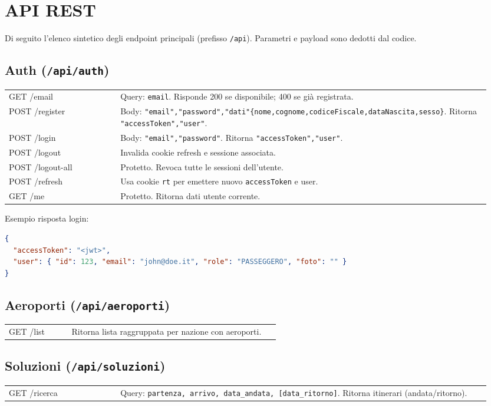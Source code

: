 \documentclass[11pt,a4paper]{article}
\begin{document}
\section{API REST}
Di seguito l'elenco sintetico degli endpoint principali (prefisso \texttt{/api}). Parametri e payload sono dedotti dal codice.

\subsection{Auth (\texttt{/api/auth})}
\begin{longtable}{p{0.22\linewidth}p{0.73\linewidth}}
GET /email & Query: \texttt{email}. Risponde 200 se disponibile; 400 se già registrata. \\
POST /register & Body: \texttt{"email","password","dati"\{nome,cognome,codiceFiscale,dataNascita,sesso\}}. Ritorna \texttt{"accessToken","user"}. \\
POST /login & Body: \texttt{"email","password"}. Ritorna \texttt{"accessToken","user"}. \\
POST /logout & Invalida cookie refresh e sessione associata. \\
POST /logout-all & Protetto. Revoca tutte le sessioni dell'utente. \\
POST /refresh & Usa cookie \texttt{rt} per emettere nuovo \texttt{accessToken} e user. \\
GET /me & Protetto. Ritorna dati utente corrente. \\
\end{longtable}

Esempio risposta login:
\begin{lstlisting}[language=JSON]
{
  "accessToken": "<jwt>",
  "user": { "id": 123, "email": "john@doe.it", "role": "PASSEGGERO", "foto": "" }
}
\end{lstlisting}

\subsection{Aeroporti (\texttt{/api/aeroporti})}
\begin{longtable}{p{0.22\linewidth}p{0.73\linewidth}}
GET /list & Ritorna lista raggruppata per nazione con aeroporti. \\
\end{longtable}

\subsection{Soluzioni (\texttt{/api/soluzioni})}
\begin{longtable}{p{0.22\linewidth}p{0.73\linewidth}}
GET /ricerca & Query: \texttt{partenza, arrivo, data\_andata, [data\_ritorno]}. Ritorna itinerari (andata/ritorno). \\
\end{longtable}
\end{document}
